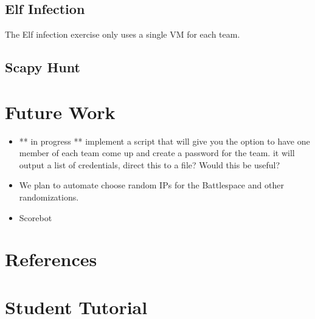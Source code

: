 \documentclass[11pt]{report}
\begin{document}
\subsection{Elf Infection}
The Elf infection exercise only uses a single VM for each team.  

\subsection{Scapy Hunt}

\section{Future Work}
\begin{itemize}
 \item ** in progress **  implement a script that will give you the option
to have one member of each team come up and create a password for the team.
it will output a list of credentials, direct this to a file?
Would this be useful?
 \item We plan to automate  choose random IPs for the Battlespace and other randomizations.
 \item Scorebot
\end{itemize}


\section{References}


\section{Student Tutorial}
\end{document}
